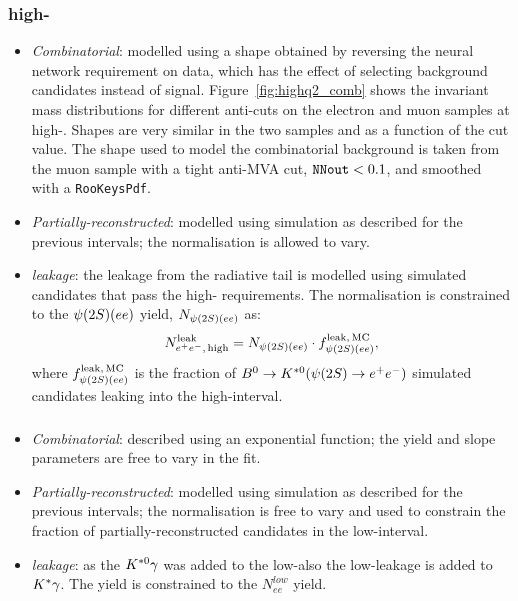 \subsubsection*{\BdToKstee high-\qsq}
%
\begin{itemize}

\item \textit{Combinatorial}: modelled using a shape obtained by reversing the neural network requirement on data,
which has the effect of selecting background candidates instead of signal.
Figure~\ref{fig:highq2_comb} shows the invariant mass distributions for different anti-cuts on the electron 
and muon samples at high-\qsq. Shapes are very similar in the two samples and as a function 
of the cut value. 
The shape used to model the combinatorial background is taken from the muon sample with a tight
anti-MVA cut, $\verb!NNout! < 0.1$, and smoothed with a \texttt{RooKeysPdf}.

\item \textit{Partially-reconstructed}: modelled using simulation as described for the previous intervals;
 the normalisation is allowed to vary.

\item \textit{\BdToKstPsi leakage}: the leakage from the \psitwos radiative tail is modelled using 
\BdToKstPsiee simulated candidates that pass the \mbox{high-\qsq} requirements. The normalisation 
is constrained to the $\psitwos(ee)$ yield, $N_{\psitwos(ee)}$ as:
%
$$N_{\ee, \, {\rm high}}^{\rm leak} = N_{\psitwos(ee)} \cdot f_{\psitwos(ee)}^{\rm leak, \,MC},$$
%
where $f_{\psitwos(ee)}^{\rm leak, \,MC}$ is the fraction of $\Bd\to\Kstarz(\psitwos\to\ee)$ simulated candidates
leaking into the high-\qsq interval.

\end{itemize}

\subsubsection*{\BdToKstG}

\begin{itemize}

\item \textit{Combinatorial}: described using an exponential function; the yield and slope parameters are free to vary in the fit.

\item \textit{Partially-reconstructed}: modelled using simulation as described for the previous intervals;
 the normalisation is free to vary and used to constrain the fraction of partially-reconstructed   candidates in the low-\qsq interval.

\item \textit{\BdToKstee leakage}: as the ${{K}^{*0}}\gamma$ was added to the low-\qsq also the low-\qsq leakage is added
to ${{K}^*}\gamma$. The yield is constrained to the $N_{ee}^{low}$ yield.

\end{itemize}

